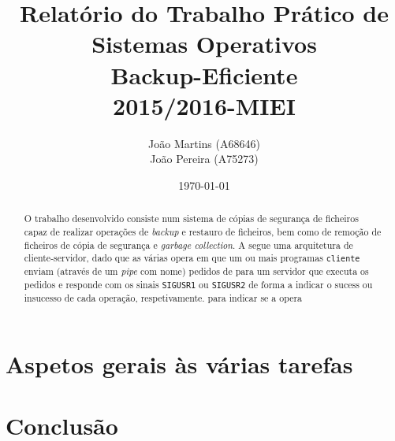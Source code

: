 \documentclass[a4paper,12pt,titlepage,portuguese]{article}
\title{Relatório do Trabalho Prático de Sistemas Operativos\\[1cm]\large{\textbf{Backup-Eficiente}}\\\large{2015/2016-MIEI}}
\author{João Martins (A68646) \\João Pereira (A75273)}
\date{\today}
\begin{document}
\maketitle

\begin{abstract}
O trabalho desenvolvido consiste num sistema de cópias de segurança de ficheiros capaz de realizar operações de \emph{backup} e restauro de ficheiros, bem como de remoção de ficheiros de cópia de segurança e \emph{garbage collection}. A segue uma arquitetura de cliente-servidor, dado que as várias opera em que um ou mais programas \texttt{cliente} enviam (através de um \emph{pipe} com nome) pedidos de  para um servidor que executa os pedidos e responde com os sinais \texttt{SIGUSR1} ou \texttt{SIGUSR2} de forma a indicar o sucess ou insucesso de cada operação, respetivamente. para indicar se a opera
\end{abstract}

\tableofcontents

\newpage


\section{Aspetos gerais às várias tarefas}


\section{Conclusão}
\end{document}
